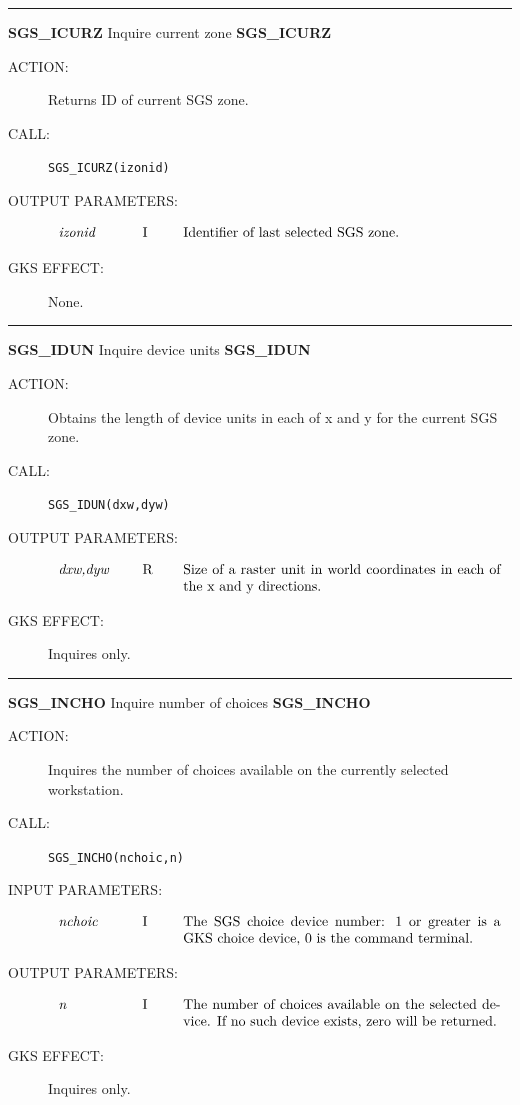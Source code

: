 \documentclass[11pt]{article}
\newcommand{\xlabel}[1]{}
\newcommand{\rthead}[2]{\rule{\textwidth}{0.3mm}
{\Large {\bf #1} \hfill #2 \hfill {\bf #1}}}
\newenvironment{params}%
{\[\begin{tabular}{p{0.14\textwidth}p{0.05\textwidth}p{0.66\textwidth}}}%
{\end{tabular}\]}
\newcommand{\rparams}[3]{{\em #1} &#2 &#3\\}
\newcommand{\rthead}[2]{\subsection{\label{#1}\xlabel{#1}#1 - #2}}
\newenvironment{params}{\begin{description}}{\end{description}}
\newcommand{\rparams}[3]{\item{{\em #1}} (#2) #3}
\begin{document}
\rthead{SGS\_ICURZ}{Inquire current zone}
\begin{description}
\item [ACTION:]
Returns ID of current SGS zone.
\item [CALL:]
{\tt SGS\_ICURZ(izonid)}
\item [OUTPUT PARAMETERS:]
\begin{params}
\rparams{izonid}{I}{Identifier of last selected SGS zone.}
\end{params}
\item [GKS EFFECT:]
None.
\end{description}
\goodbreak

\rthead{SGS\_IDUN}{Inquire device units}
\begin{description}
\item [ACTION:]
Obtains the length of device units in each of x and y for the current SGS zone.
\item [CALL:]
{\tt SGS\_IDUN(dxw,dyw)}
\item [OUTPUT PARAMETERS:]
\begin{params}
\rparams{dxw,dyw}{R}{Size of a raster unit in world coordinates in each of the
x and y directions.}
\end{params}
\item [GKS EFFECT:]
Inquires only.
\end{description}
\goodbreak

\rthead{SGS\_INCHO}{Inquire number of choices}
\begin{description}
\item [ACTION:]
Inquires the number of choices available on the currently selected workstation.
\item [CALL:]
{\tt SGS\_INCHO(nchoic,n)}
\item [INPUT PARAMETERS:]
\begin{params}
\rparams{nchoic}{I}{The SGS choice device number:
1 or greater is a GKS choice device, 0 is the command terminal.}
\end{params}
\item [OUTPUT PARAMETERS:]
\begin{params}
\rparams{n}{I}{The number of choices available on the selected device.
If no such device exists, zero will be returned.}
\end{params}
\item [GKS EFFECT:]
Inquires only.
\end{description}
\goodbreak
\end{document}
